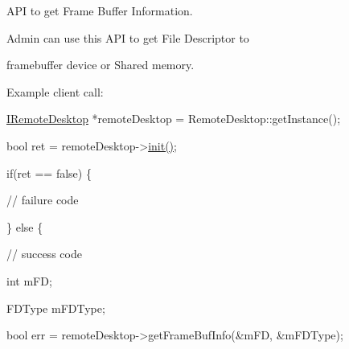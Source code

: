 \-A\-P\-I to get \-Frame \-Buffer \-Information. 

\-Admin can use this \-A\-P\-I to get \-File \-Descriptor to

framebuffer device or \-Shared memory.

\-Example client call\-:


\begin{DoxyPre}\end{DoxyPre}



\begin{DoxyPre}  \hyperlink{classknoxremotedesktop_1_1IRemoteDesktop}{IRemoteDesktop} *remoteDesktop = RemoteDesktop::getInstance();\end{DoxyPre}



\begin{DoxyPre}  bool ret = remoteDesktop->\hyperlink{classknoxremotedesktop_1_1IRemoteDesktop_a7bed40d98c61713a69cf1dad8b37beae}{init()};\end{DoxyPre}



\begin{DoxyPre}  if(ret == false)  \{\end{DoxyPre}



\begin{DoxyPre}     // failure code\end{DoxyPre}



\begin{DoxyPre}  \} else \{\end{DoxyPre}



\begin{DoxyPre}     // success code\end{DoxyPre}



\begin{DoxyPre}     int	     mFD;\end{DoxyPre}



\begin{DoxyPre}     FDType 	 mFDType;\end{DoxyPre}



\begin{DoxyPre}     bool err = remoteDesktop->getFrameBufInfo(&mFD, &mFDType);\end{DoxyPre}



